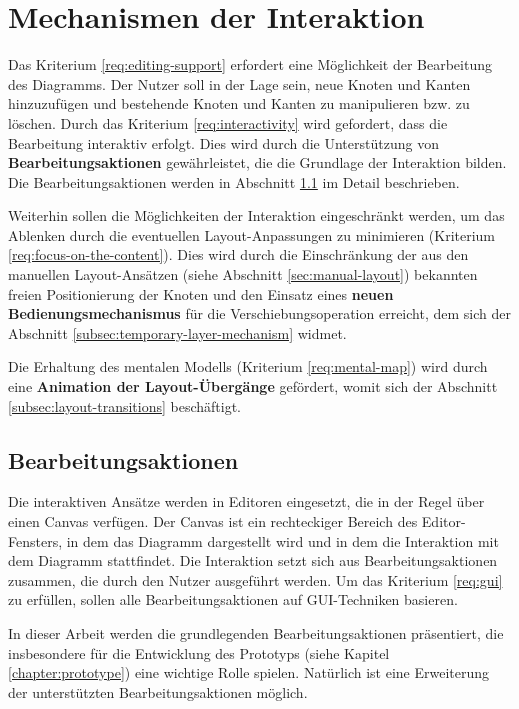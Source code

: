 
\section{Mechanismen der Interaktion}
\label{sec:interaction-mechanisms}

Das Kriterium \ref{req:editing-support} erfordert eine Möglichkeit der Bearbeitung des Diagramms. Der Nutzer soll in der Lage sein, neue Knoten und Kanten hinzuzufügen und bestehende Knoten und Kanten zu manipulieren bzw. zu löschen. Durch das Kriterium \ref{req:interactivity} wird gefordert, dass die Bearbeitung interaktiv erfolgt. Dies wird durch die Unterstützung von \textbf{Bearbeitungsaktionen} gewährleistet, die die Grundlage der Interaktion bilden. Die Bearbeitungsaktionen werden in Abschnitt \ref{subsec:edit-actions} im Detail beschrieben.

Weiterhin sollen die Möglichkeiten der Interaktion eingeschränkt werden, um das Ablenken durch die eventuellen Layout-Anpassungen zu minimieren (Kriterium \ref{req:focus-on-the-content}). Dies wird durch die Einschränkung der aus den manuellen Layout-Ansätzen (siehe Abschnitt \ref{sec:manual-layout}) bekannten freien Positionierung der Knoten und den Einsatz eines \textbf{neuen Bedienungsmechanismus} für die Verschiebungsoperation erreicht, dem sich der Abschnitt \ref{subsec:temporary-layer-mechanism} widmet.

Die Erhaltung des mentalen Modells (Kriterium \ref{req:mental-map}) wird durch eine \textbf{Animation der Layout-Übergänge} gefördert, womit sich der Abschnitt \ref{subsec:layout-transitions} beschäftigt.

\subsection{Bearbeitungsaktionen}
\label{subsec:edit-actions}

Die interaktiven Ansätze werden in Editoren eingesetzt, die in der Regel über einen Canvas verfügen. Der Canvas ist ein rechteckiger Bereich des Editor-Fensters, in dem das Diagramm dargestellt wird und in dem die Interaktion mit dem Diagramm stattfindet. Die Interaktion setzt sich aus Bearbeitungsaktionen zusammen, die durch den Nutzer ausgeführt werden. Um das Kriterium \ref{req:gui} zu erfüllen, sollen alle Bearbeitungsaktionen auf GUI-Techniken basieren.

In dieser Arbeit werden die grundlegenden Bearbeitungsaktionen präsentiert, die insbesondere für die Entwicklung des Prototyps (siehe Kapitel \ref{chapter:prototype}) eine wichtige Rolle spielen. Natürlich ist eine Erweiterung der unterstützten Bearbeitungsaktionen möglich.

